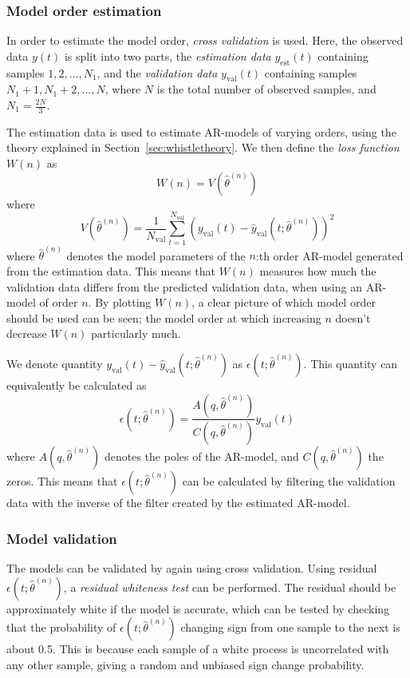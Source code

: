 \documentclass{IEEEtran}
\newcommand{\val}[1]{#1_{\text{val}}}
\newcommand{\est}[1]{#1_{\text{est}}}
\begin{document}
\subsubsection{Model order estimation}
\label{ssub:modelorderestimation}

In order to estimate the model order, \textit{cross validation} is used.
Here, the observed data $y(t)$ is split into two
parts, the \textit{estimation data} $\est{y}(t)$ containing samples $1,
2,\ldots,N_1$, and
the \textit{validation data} $\val{y}(t)$ containing samples $N_1 + 1, N_1 + 2,
\ldots,N$,
where $N$ is the total number of observed
samples, and $N_1 = \frac{2N}{3}$.

The estimation data is used to estimate AR-models of varying orders, using
the theory explained in Section~\ref{sec:whistletheory}. We then define the
\textit{loss function} $W(n)$ as
\begin{equation*}
    W(n) = V(\hat{\theta}^{(n)})
\end{equation*}
where
\begin{equation*}
    V(\hat{\theta}^{(n)}) = \frac{1}{\val{N}}\sum^{\val{N}}_{t=1}(\val{y}(t) -
        \val{\hat{y}}(t;\hat{\theta}^{(n)}))^2
\end{equation*}
where $\hat{\theta}^{(n)}$ denotes the model parameters of the $n$:th order
AR-model generated from the estimation data. This means that $W(n)$ measures
how much the validation data differs from the predicted validation data, when
using an AR-model of order $n$. By plotting $W(n)$, a
clear picture of which model order should be used can be seen; the model order at which
increasing $n$ doesn't decrease $W(n)$ particularly much.

We denote quantity $\val{y}(t) - \val{\hat{y}}(t;\hat{\theta}^{(n)})$ as
$\epsilon(t;\hat{\theta}^{(n)})$. This quantity can equivalently be calculated
as
\begin{equation*}
    \epsilon(t;\hat{\theta}^{(n)}) =
    \frac{A(q,\hat{\theta}^{(n)})}{C(q,\hat{\theta}^{(n)})}\val{y}(t)
\end{equation*}
where $A(q,\hat{\theta}^{(n)})$ denotes the poles of the AR-model, and
$C(q,\hat{\theta}^{(n)})$ the zeros. This means that
$\epsilon(t;\hat{\theta}^{(n)})$ can be calculated by filtering the validation
data with the inverse of the filter created by the estimated AR-model.

\subsubsection{Model validation}
\label{ssub:modelvalidation}
The models can be validated by again using cross validation. Using residual
$\epsilon(t;\hat{\theta}^{(n)})$, a \textit{residual whiteness test} can be
performed. The residual should be approximately white if the model is accurate,
which can be tested by checking that the probability of
$\epsilon(t;\hat{\theta}^{(n)})$ changing sign from one sample to the next is
about 0.5. This is because each sample of a white process is uncorrelated with
any other sample, giving a random and unbiased sign change probability.
\end{document}
